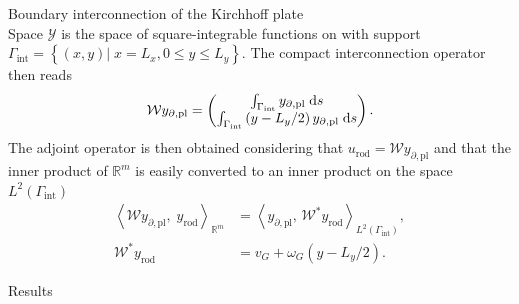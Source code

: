 \documentclass[aspectratio=169]{ISAE-Beamer}
\begin{document}
\begin{frame}{Boundary interconnection of the Kirchhoff plate}
\begin{equation*}
\end{equation*}
Space $\mathscr{Y}$ is the space of square-integrable functions on with support $\Gamma_{\text{int}} = \left\{ (x,y) \vert \; x=L_x, 0 \le y \le L_y  \right\}$. The compact interconnection operator then reads
\begin{equation*}
\mathcal{W} y_{\partial, \text{pl}} = \begin{pmatrix}
\int_{\Gamma_{\text{int}}} y_{\partial, \text{pl}} \d{s} \\
\int_{\Gamma_{\text{int}}} \left( y - L_y/2 \right) y_{\partial, \text{pl}} \d{s} \\
\end{pmatrix}.
\end{equation*}
The adjoint operator is then obtained considering that ${u}_{\text{rod}} = \mathcal{W} y_{\partial, \text{pl}}$ and that the inner product of $\mathbb{R}^m$ is easily converted to an inner product on the space $L^2(\Gamma_{\text{int}})$
\begin{align*}
\left\langle \mathcal{W} y_{\partial, \text{pl}}, \; {y}_{\text{rod}} \right\rangle_{\mathbb{R}^m} &= \left\langle y_{\partial, \text{pl}}, \, \mathcal{W}^* {y}_{\text{rod}}\right\rangle_{L^2(\Gamma_{\text{int}})}, \\
\mathcal{W}^* {y}_{\text{rod}} &= v_G + \omega_{G} \left( y - L_y/2 \right).
\end{align*}
\end{frame}


\begin{frame}{Results}
\begin{center}
\end{center}
\end{frame}
\end{document}
